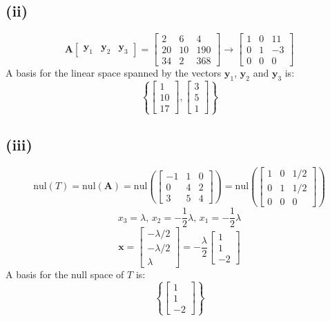 \documentclass[a4paper]{article}
\newcommand{\vv}{\mathbf}
\newcommand{\nul}{\mathrm{nul}}
\begin{document}
\subsection*{(ii)}
\[\vv A\begin{bmatrix}\vv y_1&\vv y_2&\vv y_3\end{bmatrix}
=\begin{bmatrix}2&6&4\\20&10&190\\34&2&368\end{bmatrix}
\to\begin{bmatrix}1&0&11\\0&1&-3\\0&0&0\end{bmatrix}\]
A basis for the linear space spanned by the vectors \(\vv y_1\), \(\vv y_2\) and \(\vv y_3\) is:
\[\boxed{\left\{\begin{bmatrix}1\\10\\17\end{bmatrix},\begin{bmatrix}3\\5\\1\end{bmatrix}\right\}}\]

\subsection*{(iii)}
\[\nul(T)=\nul(\vv A)=\nul\left(\begin{bmatrix}-1&1&0\\0&4&2\\3&5&4\end{bmatrix}\right)=\nul\left(\begin{bmatrix}1&0&1/2\\0&1&1/2\\0&0&0\end{bmatrix}\right)\]
\[x_3=\lambda,\,x_2=-\frac12\lambda,\,x_1=-\frac12\lambda\]
\[\vv x=\begin{bmatrix}-\lambda/2\\-\lambda/2\\\lambda\end{bmatrix}
=-\frac\lambda2\begin{bmatrix}1\\1\\-2\end{bmatrix}\]
A basis for the null space of \(T\) is:
\[\boxed{\left\{\begin{bmatrix}1\\1\\-2\end{bmatrix}\right\}}\]
\end{document}
